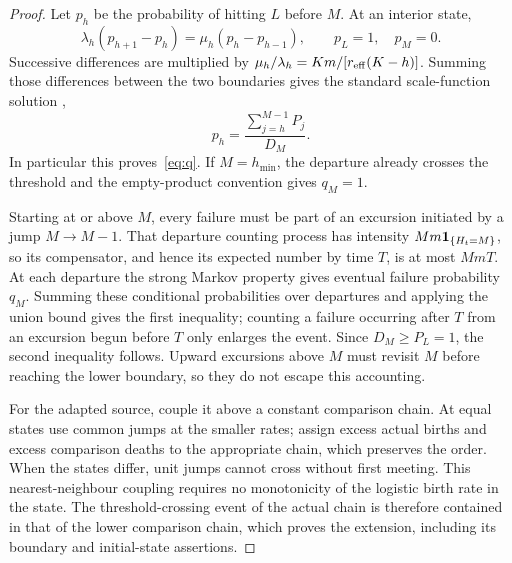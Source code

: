 \begin{proof}
Let $p_h$ be the probability of hitting $L$ before $M$. At an interior state,
\[
 \lambda_h(p_{h+1}-p_h)=\mu_h(p_h-p_{h-1}),\qquad p_L=1,\quad p_M=0.
\]
Successive differences are multiplied by $\mu_h/\lambda_h=Km/[r_{\mathrm{eff}}(K-h)]$. Summing those differences between the two boundaries gives the standard scale-function solution \citep{karlin1975},
\begin{equation}\label{eq:ph}
 p_h=\frac{\sum_{j=h}^{M-1}P_j}{D_M}.
\end{equation}
In particular this proves~\eqref{eq:q}. If $M=h_{\min}$, the departure already crosses the threshold and the empty-product convention gives $q_M=1$.

Starting at or above $M$, every failure must be part of an excursion initiated by a jump $M\to M-1$. That departure counting process has intensity $Mm\mathbf 1_{\{H_t=M\}}$, so its compensator, and hence its expected number by time $T$, is at most $MmT$. At each departure the strong Markov property gives eventual failure probability $q_M$. Summing these conditional probabilities over departures and applying the union bound gives the first inequality; counting a failure occurring after $T$ from an excursion begun before $T$ only enlarges the event. Since $D_M\ge P_L=1$, the second inequality follows. Upward excursions above $M$ must revisit $M$ before reaching the lower boundary, so they do not escape this accounting.

For the adapted source, couple it above a constant comparison chain. At equal states use common jumps at the smaller rates; assign excess actual births and excess comparison deaths to the appropriate chain, which preserves the order. When the states differ, unit jumps cannot cross without first meeting. This nearest-neighbour coupling requires no monotonicity of the logistic birth rate in the state. The threshold-crossing event of the actual chain is therefore contained in that of the lower comparison chain, which proves the extension, including its boundary and initial-state assertions.
\end{proof}

